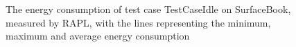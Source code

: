 \begin{figure}
                    \caption{The energy consumption of test case TestCaseIdle on SurfaceBook, measured by RAPL, with the lines representing the minimum, maximum and average energy consumption} \label{fig:time_series_TestCaseIdle_SurfaceBook_RAPL}
                    \end{figure}
                    